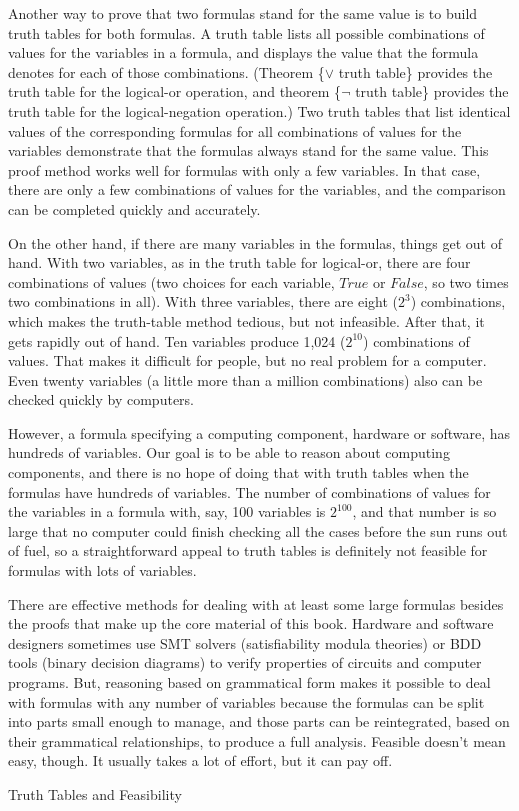 \begin{aside}
Another way to prove that two formulas stand
for the same value is to build truth tables for both formulas.
A truth table lists all possible combinations of values for the
variables in a formula, and displays the value that the formula
denotes for each of those combinations. (Theorem \{$\vee$ truth table\} provides
the truth table for the logical-or operation, and theorem \{$\neg$ truth table\}
provides the truth table for the logical-negation operation.)
Two truth tables that list identical values of the corresponding
formulas for all combinations of values for
the variables demonstrate that the formulas always stand for the
same value. This proof method works well for formulas with only
a few variables. In that case, there are only a few combinations
of values for the variables, and the comparison can be completed quickly and accurately.

On the other hand, if there are many variables in the formulas,
things get out of hand. With two variables, as in the truth table
for logical-or, there are four combinations of values
(two choices for each variable, $True$ or $False$, so two times two
combinations in all). With three variables, there are eight
($2^3$) combinations, which makes the truth-table method tedious,
but not infeasible. After that, it gets rapidly out of hand.
Ten variables produce 1,024 ($2^{10}$) combinations of values.
That makes it difficult for people, but no real problem for a computer.
Even twenty variables (a little more than a million combinations)
also can be checked quickly by computers.

However, a formula specifying a computing component,
hardware or software, has hundreds of variables.
Our goal is to be able to reason about
computing components, and there is no hope of doing that
with truth tables when the formulas have hundreds of variables. 
The number of combinations
of values for the variables in a formula with, say,
100 variables is $2^{100}$, and that number is so large that no computer could
finish checking all the cases before the sun runs out of fuel,
so a straightforward appeal to truth tables is
definitely not feasible for formulas with lots of variables.

There are effective methods 
for dealing with at least some large formulas
besides the proofs that make up the core
material of this book.
Hardware and software designers sometimes use
SMT solvers (satisfiability modula theories) or
BDD tools (binary decision diagrams)
to verify properties of circuits and computer programs.
But, reasoning based on grammatical form
makes it possible to deal with formulas with any number of variables
because the formulas can be split into parts small enough
to manage, and those parts can be reintegrated, based on
their grammatical relationships, to produce a full analysis.
Feasible doesn't mean easy, though.
It usually takes a lot of effort,
but it can pay off.
\caption{Truth Tables and Feasibility}
\label{feasibility}
\end{aside}

